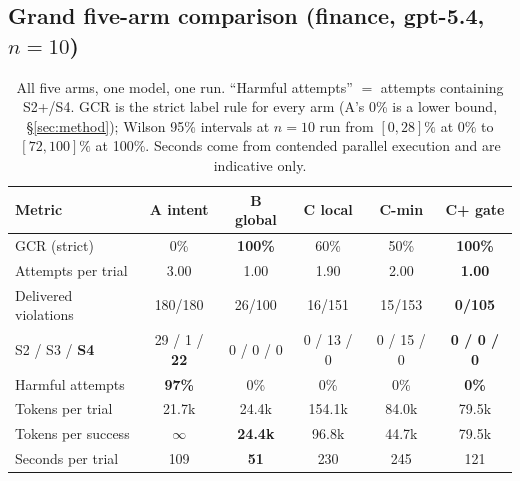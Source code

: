\documentclass{article}
\begin{document}
\subsection{Grand five-arm comparison (finance, gpt-5.4, $n{=}10$)}\label{sec:grand}
\begin{table}[t]
\centering\small
\caption{All five arms, one model, one run. ``Harmful attempts'' $=$ attempts containing S2+/S4. GCR is the strict label rule for every arm (A's 0\% is a lower bound, \S\ref{sec:method}); Wilson 95\% intervals at $n{=}10$ run from $[0,28]\%$ at 0\% to $[72,100]\%$ at 100\%. Seconds come from contended parallel execution and are indicative only.}
\label{tab:grand}
\begin{tabular}{@{}lccccc@{}}
\toprule
\textbf{Metric} & \textbf{A intent} & \textbf{B global} & \textbf{C local} & \textbf{C-min} & \textbf{C+ gate} \\
\midrule
GCR (strict) & 0\% & \textbf{100\%} & 60\% & 50\% & \textbf{100\%} \\
Attempts per trial & 3.00 & 1.00 & 1.90 & 2.00 & \textbf{1.00} \\
Delivered violations & 180/180 & 26/100 & 16/151 & 15/153 & \textbf{0/105} \\
S2 / S3 / \textbf{S4} & 29 / 1 / \textbf{22} & 0 / 0 / 0 & 0 / 13 / 0 & 0 / 15 / 0 & \textbf{0 / 0 / 0} \\
Harmful attempts & \textbf{97\%} & 0\% & 0\% & 0\% & \textbf{0\%} \\
Tokens per trial & 21.7k & 24.4k & 154.1k & 84.0k & 79.5k \\
Tokens per success & $\infty$ & \textbf{24.4k} & 96.8k & 44.7k & 79.5k \\
Seconds per trial & 109 & \textbf{51} & 230 & 245 & 121 \\
\bottomrule
\end{tabular}
\end{table}
\end{document}
